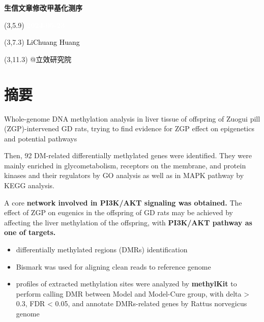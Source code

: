 \documentclass[
]{article}
\author{}
\date{\vspace{-2.5em}}
\providecommand{\tightlist}{%
  \setlength{\itemsep}{0pt}\setlength{\parskip}{0pt}}
\begin{document}
\begin{titlepage} 
\begin{center} \textbf{\Huge
生信文章修改甲基化测序} \vspace{4em}
\begin{textblock}{10}(3,5.9) \huge
\textbf{\textcolor{white}{2024-05-23}}
\end{textblock} \begin{textblock}{10}(3,7.3)
\Large \textcolor{black}{LiChuang Huang}
\end{textblock} \begin{textblock}{10}(3,11.3)
\Large \textcolor{black}{@立效研究院}
\end{textblock} \end{center} \end{titlepage}
\restoregeometry


\tableofcontents

\listoffigures

\listoftables

\newpage


\hypertarget{abstract}{%
\section{摘要}\label{abstract}}

Whole-genome DNA methylation analysis in liver
tissue of offspring of Zuogui pill (ZGP)-intervened GD rats, trying to find evidence
for ZGP effect on epigenetics and potential pathways

Then, 92 DM-related differentially
methylated genes were identified. They were mainly enriched in
glycometabolism, receptors on the membrane, and protein kinases and
their regulators by GO analysis as well as in MAPK pathway by KEGG
analysis.

A core \textbf{network involved in PI3K/AKT signaling was
obtained.} The effect of ZGP on eugenics in the offspring of GD rats
may be achieved by affecting the liver methylation of the offspring,
with \textbf{PI3K/AKT pathway as one of targets.}

\begin{itemize}
\tightlist
\item
  differentially methylated regions (DMRs) identification
\item
  Bismark was used for aligning clean reads to reference genome
\item
  profiles of extracted methylation sites were analyzed by \textbf{methylKit} to perform
  calling DMR between Model and Model-Cure group, with \textbar delta\textbar{} \textgreater{} 0.3, FDR \textless{}
  0.05, and annotate DMRs-related genes by Rattus norvegicus genome
\end{itemize}
\end{document}
